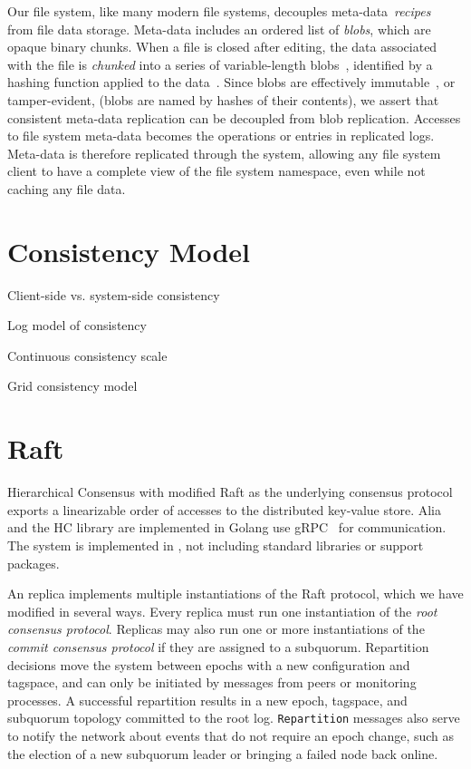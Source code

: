 Our file system, like many modern file systems,
decouples
meta-data~\emph{recipes}~\cite{casper,gfs,hadoop_hdfs,pvfs,globalfs}
from file
data storage.
Meta-data includes an ordered list of \emph{blobs}, which are opaque binary chunks.
When a file is closed after editing, the data associated with the file is \emph{chunked} into a
series of variable-length blobs~\cite{lbfs}, identified by a hashing function applied to
the data~\cite{rabin_karp,rabin_fingerprint}.
Since blobs are effectively immutable~\cite{immutability_changes_everything}, or tamper-evident, (blobs are named by hashes of
their contents), we assert that consistent meta-data replication can be decoupled from blob
replication.
Accesses to file system meta-data becomes the operations or entries in replicated logs.
Meta-data is therefore replicated through the system, allowing any file
system client to have a complete view of the file system namespace, even while
not caching any file data.

\section{Consistency Model}

Client-side vs. system-side consistency

Log model of consistency

Continuous consistency scale

Grid consistency model

\section{Raft}

Hierarchical Consensus with modified Raft as the underlying consensus
protocol exports a linearizable order of accesses to the distributed key-value
store.
Alia and the HC library are implemented in Golang use gRPC~\cite{grpc} for
communication.
The system is implemented in , not including standard
libraries or support packages.

An  replica implements multiple instantiations of the Raft protocol, which we have modified in several ways.
Every replica must run one instantiation of the \textit{root consensus protocol}.
Replicas may also run one or more instantiations of the \textit{commit consensus protocol} if they are assigned to a subquorum.
Repartition decisions move the system between epochs with a new configuration and tagspace, and can only be initiated by messages from peers or monitoring processes.
A successful repartition results in a new epoch, tagspace, and subquorum topology committed to the root log.
\texttt{Repartition} messages also serve to notify the network about events that do not require an epoch change, such as the election of a new subquorum leader or bringing a failed node back online.

